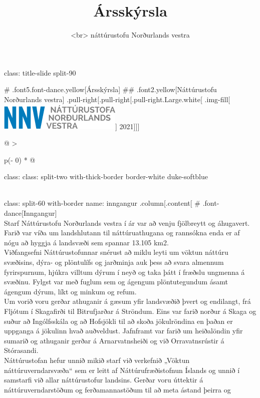 \documentclass[
]{article}
\title{Ársskýrsla}
\subtitle{\textless br️\textgreater{} náttúrustofu Norðurlands vestra}
\author{}
\date{\vspace{-2.5em}}
\begin{document}
\maketitle

class: title-slide split-90

\# .font5.font-dance.yellow{[}Ársskýrsla{]} \#\#
.font2.yellow{[}Náttúrustofu Norðurlands vestra{]}
.pull-right{[}.pull-right{[}.pull-right.Large.white{[}
.img-fill{[}\includegraphics{myndir/nnvlogo.png}{]} 2021{]}{]}{]}

\begin{longtable}[]{@{}
  >{\raggedright\arraybackslash}p{(\columnwidth - 0\tabcolsep) * }@{}}
\toprule
\begin{minipage}[b]{\linewidth}\raggedright
class: class: split-two with-thick-border border-white duke-softblue
\end{minipage} \\
\midrule
\endhead
class: split-60 with-border name: inngangur .column{[}.content{[} \#
.font-dance{[}Inngangur{]} \\
Starf Náttúrustofu Norðurlands vestra í ár var að venju fjölbreytt og
áhugavert. Farið var víða um landshlutann til náttúruathugana og
rannsókna enda er af nógu að hyggja á landsvæði sem spannar 13.105
km2. \\
Viðfangsefni Náttúrustofunnar snérust að miklu leyti um vöktun náttúru
svæðisins, dýra- og plöntulífs og jarðminja auk þess að svara almennum
fyrirspurnum, hjúkra villtum dýrum í neyð og taka þátt í fræðslu
ungmenna á svæðinu. Fylgst var með fuglum sem og ágengum plöntutegundum
ásamt ágengum dýrum, líkt og minkum og refum. \\
Um vorið voru gerðar athuganir á gæsum yfir landsvæðið þvert og
endilangt, frá Fljótum í Skagafirði til Bitrufjarðar á Ströndum. Eins
var farið norður á Skaga og suður að Ingólfsskála og að Hofsjökli til að
skoða jökulröndina en þaðan er uppganga á jökulinn hvað auðveldust.
Jafnframt var farið um heiðalöndin yfir sumarið og athuganir gerðar á
Arnarvatnsheiði og við Orravatnsrústir á Stórasandi. \\
Náttúrustofan hefur unnið mikið starf við verkefnið „Vöktun
náttúruverndarsvæða`` sem er leitt af Náttúrufræðistofnun Íslands og
unnið í samstarfi við allar náttúrustofur landsins. Gerðar voru úttektir
á náttúruverndarstöðum og ferðamannastöðum til að meta ástand þeirra og

\end{longtable}
\end{document}
